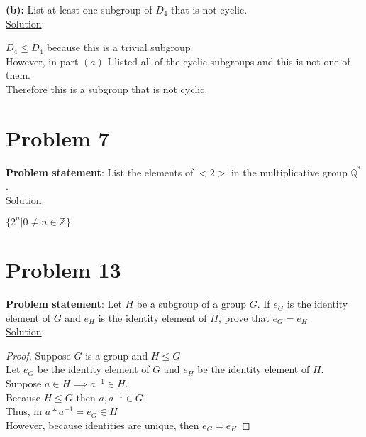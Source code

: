 \documentclass{article} %
\begin{document}
\textbf{(b): } List at least one subgroup of $D_4$ that is not cyclic.
\\

\underline{Solution}: 
\begin{addmargin}[1em]{0em}
$D_4 \leq D_4$ because this is a trivial subgroup.\
\\However, in part $(a)$ I listed all of the cyclic subgroups and this is not one of them.
\\Therefore this is a subgroup that is not cyclic.
\end{addmargin}   

\newpage
\section*{Problem 7}


\textbf{Problem statement}: List the elements of $<2>$ in the multiplicative group $\mathbb{Q}^*$.
\\

\underline{Solution}: 
\begin{addmargin}[1em]{0em}
$\{2^n | 0 \neq n \in \mathbb{Z} \}$
\end{addmargin}    

\newpage
\section*{Problem 13}


\textbf{Problem statement}: Let $H$ be a subgroup of a group $G$.  If $e_G$ is the identity element of $G$ and $e_H$ is the identity element of $H$, prove that $e_G = e_H$
\\

\underline{Solution}: 
\begin{addmargin}[1em]{0em}
\begin{proof}
Suppose $G$ is a group and $H \leq G$
\\Let $e_G$ be the identity element of $G$ and $e_H$ be the identity element of $H$.
\\Suppose $a \in H \implies a^{-1} \in H$.
\\Because $H \leq G$ then $a, a^{-1} \in G$
\\Thus, in $a*a^{-1} = e_G \in H$
\\However, because identities are unique, then $e_G = e_H$
\end{proof}
\end{addmargin}    
\end{document}
